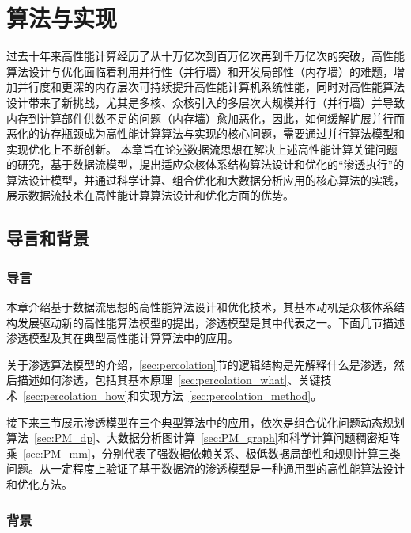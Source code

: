 \chapter{算法与实现}\label{chap:algo}

\begin{flushleft}  %
\setlength{\parindent}{2em} %

\qquad  

过去十年来高性能计算经历了从十万亿次到百万亿次再到千万亿次的突破，高性能算法设计与优化面临着利用并行性（并行墙）和开发局部性（内存墙）的难题，增加并行度和更深的内存层次可持续提升高性能计算机系统性能，同时对高性能算法设计带来了新挑战，尤其是多核、众核引入的多层次大规模并行（并行墙）并导致内存到计算部件供数不足的问题（内存墙）愈加恶化，因此，如何缓解扩展并行而恶化的访存瓶颈成为高性能计算算法与实现的核心问题，需要通过并行算法模型和实现优化上不断创新。
本章旨在论述数据流思想在解决上述高性能计算关键问题的研究，基于数据流模型，提出适应众核体系结构算法设计和优化的“渗透执行”的算法设计模型，并通过科学计算、组合优化和大数据分析应用的核心算法的实践，展示数据流技术在高性能计算算法设计和优化方面的优势。

\section{导言和背景}
\subsection{导言}
本章介绍基于数据流思想的高性能算法设计和优化技术，其基本动机是众核体系结构发展驱动新的高性能算法模型的提出，渗透模型是其中代表之一。下面几节描述渗透模型及其在典型高性能计算算法中的应用。

关于渗透算法模型的介绍，\ref{sec:percolation}节的逻辑结构是先解释什么是渗透，然后描述如何渗透，包括其基本原理~\ref{sec:percolation_what}、关键技术~\ref{sec:percolation_how}和实现方法~\ref{sec:percolation_method}。

接下来三节展示渗透模型在三个典型算法中的应用，依次是组合优化问题动态规划算法~\ref{sec:PM_dp}、大数据分析图计算~\ref{sec:PM_graph}和科学计算问题稠密矩阵乘~\ref{sec:PM_mm}，分别代表了强数据依赖关系、极低数据局部性和规则计算三类问题。从一定程度上验证了基于数据流的渗透模型是一种通用型的高性能算法设计和优化方法。

\subsection{背景}


\end{flushleft}
